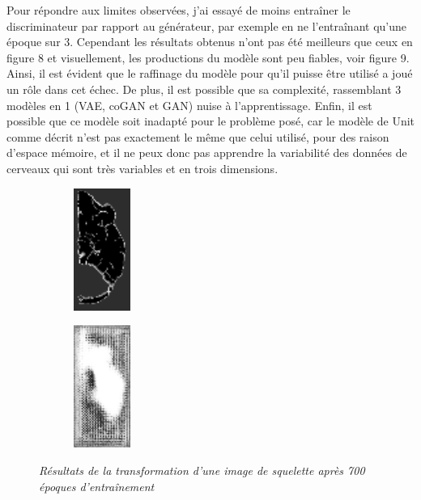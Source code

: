 \documentclass[12pt, oneside, a4paper, titlepage]{article}
\begin{document}
\vspace{5mm}

Pour répondre aux limites observées, j'ai essayé de moins entraîner le discriminateur par rapport au générateur, par exemple en ne l'entraînant qu'une époque sur 3. Cependant les résultats obtenus n'ont pas été meilleurs que ceux en figure 8 et visuellement, les productions du modèle sont peu fiables, voir figure 9. Ainsi, il est évident que le raffinage du modèle pour qu'il puisse être utilisé a joué un rôle dans cet échec. De plus, il est possible que sa complexité, rassemblant 3 modèles en 1 (VAE, coGAN et GAN) nuise à l'apprentissage. Enfin, il est possible que ce modèle soit inadapté pour le problème posé, car le modèle de Unit comme décrit n'est pas exactement le même que celui utilisé, pour des raison d'espace mémoire, et il ne peux donc pas apprendre la variabilité des données de cerveaux qui sont très variables et en trois dimensions. 

\vspace{5mm}
\begin{figure}[H]
\centering
\begin{subfigure}{.2\textwidth}
  \includegraphics[width=2cm, height=4cm]{X1_150.png}
  \label{fig:sub1}
\end{subfigure}%
\begin{subfigure}{.2\textwidth}
  \includegraphics[width=2cm, height=4cm]{fake_X2_150.png}
  \label{fig:sub2}
\end{subfigure}
\caption{\textit{Résultats de la transformation d'une image de squelette après 700 époques d'entraînement}}
\label{fig:res_Unit}
\end{figure}


\vspace{0.5cm}
\end{document}
